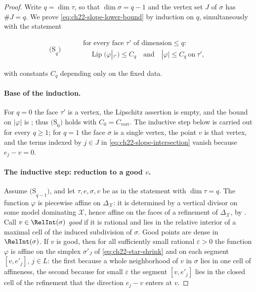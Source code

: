 \begin{proof}
Write \(q=\dim\tau\), so that \(\dim\sigma=q-1\) and the vertex set
\(J\) of \(\sigma\) has \(\#J=q\).  We prove
\eqref{eq:ch22-slope-lower-bound} by induction on \(q\), simultaneously with
the statement

\[
 \mathrm{(S}_q\mathrm{)}\qquad
 \begin{aligned}
 &\text{for every face }\tau'\text{ of dimension}\leq q:\\
 &\quad\operatorname{Lip}(\varphi|_{\tau'})\leq C_q
 \quad\text{and}\quad
 |\varphi|\leq C_q\ \text{on}\ \tau' ,
 \end{aligned}
\tag{22.44}\label{eq:ch22-induction-statement}
\]

with constants \(C_q\) depending only on the fixed data.

\paragraph{Base of the induction.}
For \(q=0\) the face \(\tau'\) is a vertex, the Lipschitz assertion is
empty, and the bound on \(|\varphi|\) is
; thus \(\mathrm{(S}_0\mathrm{)}\) holds
with \(C_0=C_{\mathrm{vert}}\).  The inductive step below is carried out for
every \(q\geq1\); for \(q=1\) the face \(\sigma\) is a single vertex, the
point \(v\) is that vertex, and the terms indexed by \(j\in J\) in
\eqref{eq:ch22-slope-intersection} vanish because \(e_j-v=0\).

\paragraph{The inductive step: reduction to a good \(v\).}
Assume \(\mathrm{(S}_{q-1}\mathrm{)}\), and let \(\tau,e,\sigma,v\) be as in
the statement with \(\dim\tau=q\).  The function \(\varphi\) is piecewise
affine on \(\Delta_{\mathcal X}\): it is determined by a vertical divisor on
some model dominating \(\mathcal X\), hence affine on the faces of a
refinement of \(\Delta_{\mathcal X}\), by
.  Call \(v\in\RelInt(\sigma)\) \emph{good} if
it is rational and lies in the relative interior of a maximal cell of the
induced subdivision of \(\sigma\).  Good points are dense in
\(\RelInt(\sigma)\).  If \(v\) is good, then for all sufficiently small
rational \(\varepsilon>0\) the function \(\varphi\) is affine on the simplex
\(\sigma'_J\) of \eqref{eq:ch22-star-shrink} and on each segment
\([v,e'_j]\), \(j\in L\): the first because a whole neighborhood of \(v\) in
\(\sigma\) lies in one cell of affineness, the second because for small
\(\varepsilon\) the segment \([v,e'_j]\) lies in the closed cell of the
refinement that the direction \(e_j-v\) enters at \(v\).


\end{proof}
